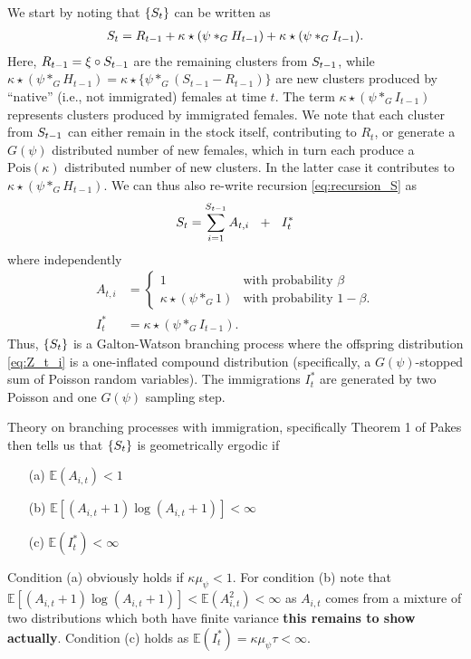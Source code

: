 \documentclass[10pt,a4paper]{article}
\begin{document}
We start by noting that $\{S_t\}$ can be written as
\begin{align}
S_t = R_{t - 1} + \kappa \star (\psi *_G H_{t - 1}) + \kappa \star (\psi *_G I_{t - 1}). \label{eq:recursion_S}
\end{align}
Here, $R_{t - 1} = \xi \circ S_{t - 1}$ are the remaining clusters from $ S_{t - 1}$, while $\kappa \star (\psi *_G H_{t - 1}) = \kappa \star \{\psi *_G (S_{t - 1} - R_{t - 1})\}$ are new clusters produced by ``native'' (i.e., not immigrated) females at time $t$. The term $\kappa \star (\psi *_G I_{t - 1})$ represents clusters produced by immigrated females. We note that each cluster from $S_{t - 1}$ can either remain in the stock itself, contributing to $R_t$, or generate a $G(\psi)$ distributed number of new females, which in turn each produce a $\text{Pois}(\kappa)$ distributed number of new clusters. In the latter case it contributes to $\kappa \star (\psi *_G H_{t - 1})$. We can thus also re-write recursion \eqref{eq:recursion_S} as
$$
\juv_t = \sum_{i = 1}^{\juv_{t - 1}} A_{t, i} \ \ + \ \ I^*_t
$$
where independently
\begin{align}
A_{t, i} & = \begin{cases}
1 & \text{with probability } \beta\\
\kappa \star (\psi *_G 1) & \text{with probability } 1 - \beta.
\label{eq:Z_t_i}
\end{cases}\\
I^*_t & = \kappa\star (\psi *_G I_{t - 1}). \nonumber
\end{align}
Thus, $\{S_t\}$ is a Galton-Watson branching process where the offspring distribution \eqref{eq:Z_t_i} is a one-inflated compound distribution (specifically, a $G(\psi)$-stopped sum of Poisson random variables). The immigrations $I^*_t$ are generated by two Poisson and one $G(\psi)$ sampling step. %

Theory on branching processes with immigration, specifically Theorem 1 of Pakes \cite{Pakes1971} then tells us that $\{S_t\}$ is geometrically ergodic if
\begin{itemize}
\item[(a)] $\mathbb{E}(A_{i, t}) < 1$
\item[(b)] $\mathbb{E}[(A_{i, t} + 1)\log(A_{i, t} + 1)] < \infty$
\item[(c)] $\mathbb{E}(I^*_t) < \infty$
\end{itemize}
Condition (a) obviously holds if $\kappa\mu_\psi < 1$. For condition (b) note that $\mathbb{E}[(A_{i, t} + 1)\log(A_{i, t} + 1)] < \mathbb{E}(A_{i, t}^2) < \infty$ as $A_{i, t}$ comes from a mixture of two distributions which both have finite variance \textbf{this remains to show actually}. Condition (c) holds as $\mathbb{E}(I^*_t) = \kappa\mu_\psi\tau < \infty$.
\end{document}
